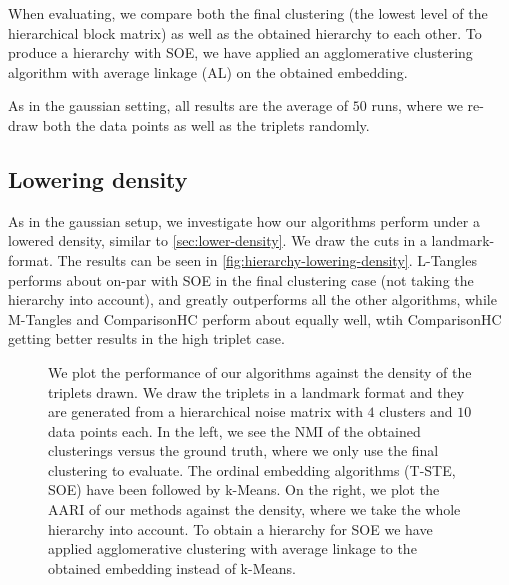 When evaluating, we compare both the final clustering (the lowest level of the hierarchical block matrix) as well as the obtained hierarchy to each other. 
To produce a hierarchy with SOE, we have applied an agglomerative clustering algorithm with average linkage (AL) on the obtained embedding.

As in the gaussian setting, all results are the average of $50$ runs, where we re-draw both the data points as well as the triplets randomly. 

\subsection{Lowering density}
As in the gaussian setup, we investigate how our algorithms perform under a lowered density, similar to \autoref{sec:lower-density}. We draw the cuts in a landmark-format. The results can be seen in 
\autoref{fig:hierarchy-lowering-density}. L-Tangles performs about on-par with SOE in the final clustering case (not taking the hierarchy into account), and greatly outperforms all the other 
algorithms, while M-Tangles and ComparisonHC perform about equally well, wtih ComparisonHC getting better results in the high triplet case.

\onecolumn
\begin{figure}[ht]
    \centering
    \caption{
        We plot the performance of our algorithms against the density of the triplets drawn. We draw the triplets in a landmark format 
        and they are generated from a hierarchical noise matrix with $4$ clusters and $10$ data points each. In the left, we see the NMI of 
        the obtained clusterings versus the ground truth, where we only use the final clustering to evaluate. The ordinal embedding algorithms
        (T-STE, SOE) have been followed by k-Means. On the right, 
        we plot the AARI of our methods against the density, where we take the whole hierarchy into account. To obtain a hierarchy for SOE
        we have applied agglomerative clustering with average linkage to the obtained embedding instead of k-Means.
    }
    \label{fig:hierarchy-lowering-density}
\end{figure}

